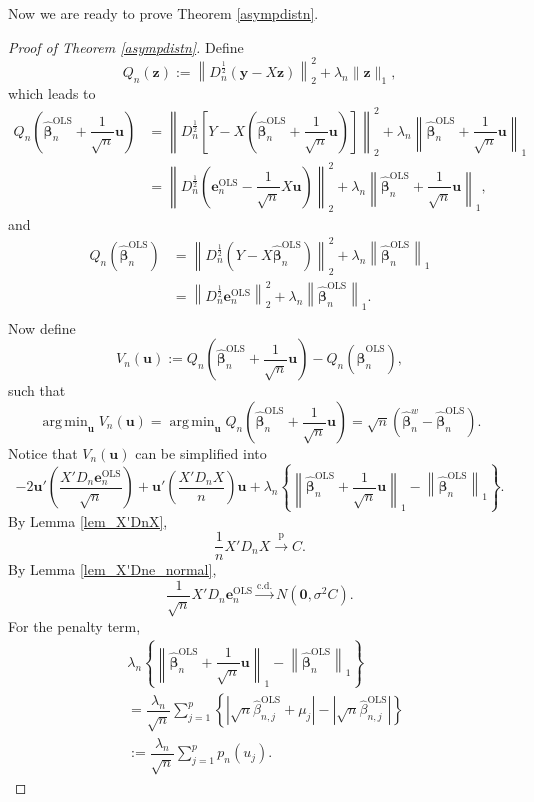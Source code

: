 \documentclass[12pt]{article}
\DeclareMathOperator*{\argmin}{arg\,min} %
\newcommand{\bnw}{\widehat{\bm{\beta}}_n^w} %
\newcommand{\bLS}{\widehat{\bm{\beta}}_n^{\text{OLS}}} %
\newcommand{\eLS}{\bm{e}_n^{\text{OLS}}} %
\newcommand{\dn}{\dfrac{1}{n}} %
\newcommand{\dqn}{\dfrac{1}{\sqrt{n}}} %
\newcommand{\CONV}[1]{\stackrel{\text{#1}}{\longrightarrow}} %
\newcommand{\bu}{\bm{u}} %
\begin{document}
Now we are ready to prove Theorem \ref{asympdistn}. 

\begin{proof} [Proof of Theorem \ref{asympdistn}]
	Define 
	$$
	Q_n (\bm{z}) := \left\| 
						 	D_n^{\frac{1}{2}} (\bm{y} - X \bm{z})
				    \right\|_2^2 
				    + \lambda_n \| \bm{z} \|_1,
	$$
	which leads to 
	\begin{align*}
	Q_n \left( \bLS + \dqn \bu \right)
	&= \left\| 
			  D_n^{\frac{1}{2}} 
			  \left[
			  		Y - X \left( \bLS + \dqn \bu \right)				
			  \right]	
	   \right\|_2^2
	   + \lambda_n \left\|
	   					 \bLS + \dqn \bu
	   			   \right\|_1 \\
	&= \left\| 
			 D_n^{\frac{1}{2}} 
			\left( 
				 \eLS - \dqn X \bu 
			\right)				
		\right\|_2^2
		+ \lambda_n \left\|
						\bLS + \dqn \bu
					\right\|_1, 
	\end{align*}
	and 
	\begin{align*}
	Q_n \left( \bLS  \right)
	&= \left\| 
			 D_n^{\frac{1}{2}} 
			 \left( 
				  Y - X \bLS 
			 \right)				
		\right\|_2^2
		+ \lambda_n \left\| \bLS \right\|_1 \\
	&= \left\| 
			 D_n^{\frac{1}{2}} \eLS		
	   \right\|_2^2
	   + \lambda_n \left\| \bLS \right\|_1 .\\
	\end{align*}
	Now define
	$$
	V_n(\bu) := Q_n \left( \bLS  + \dqn \bu \right) - Q_n \left( \bLS  \right), 
	$$
	such that 
	$$
	\argmin_{\bu} V_n(\bu)
	= \argmin_{\bu}  Q_n \left( \bLS  + \dqn \bu \right)
	= \sqrt{n} \left( \bnw - \bLS \right).
	$$
	Notice that $V_n(\bu)$ can be simplified into 
	$$
	-2 \bu' \left( \dfrac{X' D_n \eLS}{\sqrt{n}} \right)
	+ \bu' \left( \dfrac{X' D_n X}{n} \right) \bu
	+ \lambda_n \left\{
					\left\| \bLS + \dqn \bu \right\|_1
					- \left\| \bLS \right\|_1 
				\right\}.
	$$
	By Lemma \ref{lem_X'DnX}, 
	$$
	\dn X' D_n X \CONV{p} C.
	$$
	By Lemma \ref{lem_X'Dne_normal}, 
	$$
	\dqn X' D_n \eLS 
	\CONV{c.d.}
	N \left( \bm{0}, \sigma^2 C \right).
	$$
	For the penalty term,
	\begin{align*}
	&\lambda_n \left\{
					\left\| \bLS + \dqn \bu \right\|_1
					- \left\| \bLS \right\|_1 
			   \right\} \\
	&= \dfrac{\lambda_n}{\sqrt{n}} 
		\sum_{j=1}^p
		\left\{
				\left| 
						\sqrt{n} \widehat{\beta}_{n,j}^{\text{OLS}} 
						+ \mu_j
				\right|
			  - \left|
			  			\sqrt{n} \widehat{\beta}_{n,j}^{\text{OLS}}
			   	\right|
		\right\} \\
	&:= \dfrac{\lambda_n}{\sqrt{n}}
		 \sum_{j=1}^p
		 p_n(u_j). 

\end{align*}
\end{proof}
\end{document}
